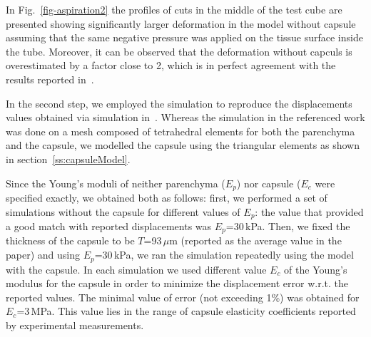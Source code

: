 \documentclass{acm_proc_article-sp}
\newcommand{\TG}[1]{{\color{blue}\textbf{TG: #1}}}
\begin{document}
In Fig.~\ref{fig-aspiration2} the profiles of cuts in the middle of the
test cube are presented showing significantly larger deformation in the model without capsule assuming that the same negative pressure was applied 
on the tissue surface inside the tube. Moreover, it can be observed that the deformation without capculs is overestimated by a factor 
close to 2, which is in perfect agreement with the results reported in~\cite{Hollenstein2006}.

In the second step, we employed the simulation to reproduce the displacements values obtained via simulation in~\cite{Hollenstein2006,Nava2008}.
Whereas the simulation in the referenced work was done on a mesh composed of tetrahedral elements for both the parenchyma 
and the capsule, we modelled the capsule using the triangular elements as shown in section~\ref{ss:capsuleModel}.

Since the Young's moduli of neither parenchyma ($E_p$) nor capsule ($E_c$ were specified exactly, we obtained both as follows: first, 
we performed a set of simulations without the capsule for different values of $E_p$: the value that provided a good match 
with reported displacements was $E_p$=30\,kPa. 
Then, we fixed the thickness of the capsule to be $T$=93\,$\mu$m (reported as the average value in the paper) and 
using $E_p$=30\,kPa, we ran the simulation repeatedly using the model with the capsule. In each simulation we 
used different value $E_c$ of the Young's modulus for the capsule in order to minimize the displacement error w.r.t. the 
reported values. The minimal value of error (not exceeding 1\%) was obtained for $E_c$=3\,MPa. This 
value lies in the range of capsule elasticity coefficients reported by experimental measurements.


\end{document}

